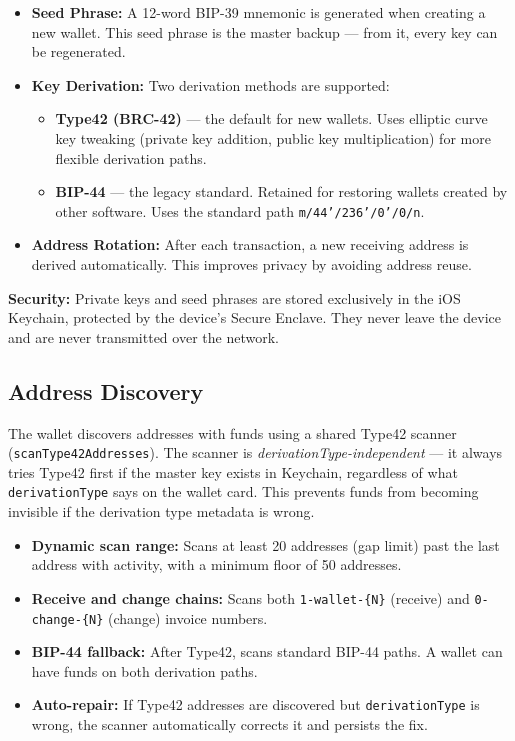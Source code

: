 \documentclass[a4paper, 11pt, openany]{book}
\begin{document}
\begin{itemize}
\item \textbf{Seed Phrase:} A 12-word BIP-39 mnemonic is generated when creating a new wallet. This seed phrase is the master backup --- from it, every key can be regenerated.
\item \textbf{Key Derivation:} Two derivation methods are supported:
  \begin{itemize}
  \item \textbf{Type42 (BRC-42)} --- the default for new wallets. Uses elliptic curve key tweaking (private key addition, public key multiplication) for more flexible derivation paths.
  \item \textbf{BIP-44} --- the legacy standard. Retained for restoring wallets created by other software. Uses the standard path \texttt{m/44'/236'/0'/0/n}.
  \end{itemize}
\item \textbf{Address Rotation:} After each transaction, a new receiving address is derived automatically. This improves privacy by avoiding address reuse.
\end{itemize}

\begin{notebox}
\textbf{Security:} Private keys and seed phrases are stored exclusively in the iOS Keychain, protected by the device's Secure Enclave. They never leave the device and are never transmitted over the network.
\end{notebox}

\subsection{Address Discovery}

The wallet discovers addresses with funds using a shared Type42 scanner (\texttt{scan\-Type42\-Addresses}). The scanner is \emph{derivationType-independent} --- it always tries Type42 first if the master key exists in Keychain, regardless of what \texttt{derivationType} says on the wallet card. This prevents funds from becoming invisible if the derivation type metadata is wrong.

\begin{itemize}
\item \textbf{Dynamic scan range:} Scans at least 20 addresses (gap limit) past the last address with activity, with a minimum floor of 50 addresses.
\item \textbf{Receive and change chains:} Scans both \texttt{1-wallet-\{N\}} (receive) and \texttt{0-change-\{N\}} (change) invoice numbers.
\item \textbf{BIP-44 fallback:} After Type42, scans standard BIP-44 paths. A wallet can have funds on both derivation paths.
\item \textbf{Auto-repair:} If Type42 addresses are discovered but \texttt{derivationType} is wrong, the scanner automatically corrects it and persists the fix.
\end{itemize}
\end{document}
